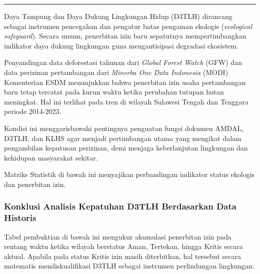 \documentclass[
]{article}
\begin{document}
\begin{center}\rule{0.5\linewidth}{0.5pt}\end{center}

Daya Tampung dan Daya Dukung Lingkungan Hidup (D3TLH) dirancang sebagai
instrumen pencegahan dan pengatur batas pengaman ekologis
(\emph{ecological safeguard}). Secara umum, penerbitan izin baru
sepatutnya mempertimbangkan indikator daya dukung lingkungan guna
mengantisipasi degradasi ekosistem.

Penyandingan data deforestasi tahunan dari \emph{Global Forest Watch}
(GFW) dan data perizinan pertambangan dari \emph{Minerba One Data
Indonesia} (MODI) Kementerian ESDM menunjukkan bahwa penerbitan izin
usaha pertambangan baru tetap tercatat pada kurun waktu ketika perubahan
tutupan hutan meningkat. Hal ini terlihat pada tren di wilayah Sulawesi
Tengah dan Tenggara periode 2014-2023.

Kondisi ini menggarisbawahi pentingnya penguatan fungsi dokumen AMDAL,
D3TLH, dan KLHS agar menjadi pertimbangan utama yang mengikat dalam
pengambilan keputusan perizinan, demi menjaga keberlanjutan lingkungan
dan kehidupan masyarakat sekitar.

Matriks Statistik di bawah ini menyajikan perbandingan indikator status
ekologis dan penerbitan izin.

\subsubsection{Konklusi Analisis Kepatuhan D3TLH Berdasarkan Data
Historis}\label{konklusi-analisis-kepatuhan-d3tlh-berdasarkan-data-historis}

Tabel pembuktian di bawah ini mengukur akumulasi penerbitan izin pada
rentang waktu ketika wilayah berstatus Aman, Tertekan, hingga Kritis
secara aktual. Apabila pada status Kritis izin masih diterbitkan, hal
tersebut secara matematis mendiskualifikasi D3TLH sebagai instrumen
perlindungan lingkungan.
\end{document}
